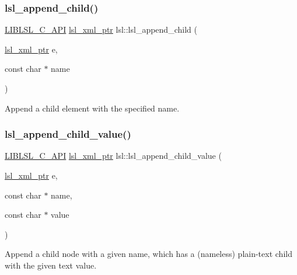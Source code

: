 \subsubsection{\texorpdfstring{lsl\+\_\+append\+\_\+child()}{lsl\_append\_child()}}
{\footnotesize\ttfamily \hyperlink{lsl__cpp_8h_aafd0ef1813e8be84a1420c4f1df64615}{L\+I\+B\+L\+S\+L\+\_\+\+C\+\_\+\+A\+PI} \hyperlink{namespacelsl_a5edc7a49a1a1be1634fe6dce3d59c59b}{lsl\+\_\+xml\+\_\+ptr} lsl\+::lsl\+\_\+append\+\_\+child (\begin{DoxyParamCaption}\item[{\hyperlink{namespacelsl_a5edc7a49a1a1be1634fe6dce3d59c59b}{lsl\+\_\+xml\+\_\+ptr}}]{e,  }\item[{const char $\ast$}]{name }\end{DoxyParamCaption})}

Append a child element with the specified name. \mbox{\label{namespacelsl_a3d9fb84fd68c84dd8692e25f1461a894}} 
\subsubsection{\texorpdfstring{lsl\+\_\+append\+\_\+child\+\_\+value()}{lsl\_append\_child\_value()}}
{\footnotesize\ttfamily \hyperlink{lsl__cpp_8h_aafd0ef1813e8be84a1420c4f1df64615}{L\+I\+B\+L\+S\+L\+\_\+\+C\+\_\+\+A\+PI} \hyperlink{namespacelsl_a5edc7a49a1a1be1634fe6dce3d59c59b}{lsl\+\_\+xml\+\_\+ptr} lsl\+::lsl\+\_\+append\+\_\+child\+\_\+value (\begin{DoxyParamCaption}\item[{\hyperlink{namespacelsl_a5edc7a49a1a1be1634fe6dce3d59c59b}{lsl\+\_\+xml\+\_\+ptr}}]{e,  }\item[{const char $\ast$}]{name,  }\item[{const char $\ast$}]{value }\end{DoxyParamCaption})}

Append a child node with a given name, which has a (nameless) plain-\/text child with the given text value. \mbox{\label{namespacelsl_a52061cbc108b95b34aa7d806d6115f91}} 

